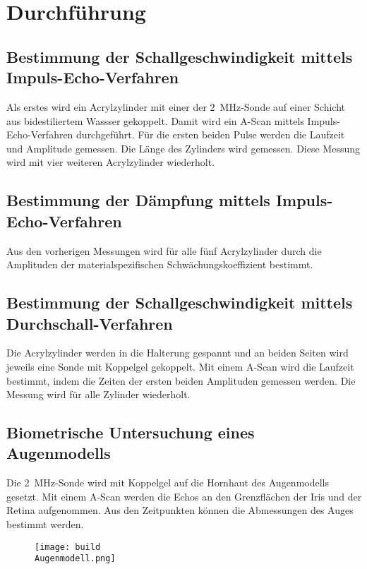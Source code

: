 \section{Durchführung}
\label{sec:Durchführung}

\subsection{Bestimmung der Schallgeschwindigkeit mittels Impuls-Echo-Verfahren}
Als erstes wird ein Acrylzylinder mit 
einer der \SI{2}{\mega\hertz}-Sonde auf einer Schicht aus bidestiliertem 
Wassser gekoppelt. Damit wird ein A-Scan mittels 
Impuls-Echo-Verfahren durchgeführt. Für die ersten beiden 
Pulse werden die Laufzeit und Amplitude 
gemessen. 
Die Länge des Zylinders wird gemessen.
Diese Messung wird mit vier weiteren Acrylzylinder wiederholt. 

\subsection{Bestimmung der Dämpfung mittels Impuls-Echo-Verfahren}
Aus den vorherigen Messungen wird für alle fünf Acrylzylinder
durch die Amplituden der materialspezifischen Schwächungskoeffizient bestimmt.

\subsection{Bestimmung der Schallgeschwindigkeit mittels Durchschall-Verfahren}
Die Acrylzylinder werden in die Halterung gespannt und an 
beiden Seiten wird jeweils eine Sonde mit Koppelgel gekoppelt. 
Mit einem A-Scan wird die Laufzeit bestimmt, indem die Zeiten
der ersten beiden Amplituden gemessen werden. Die Messung wird für alle 
Zylinder wiederholt.

\subsection{Biometrische Untersuchung eines Augenmodells}
Die \SI{2}{\mega\hertz}-Sonde wird mit Koppelgel auf die
Hornhaut des Augenmodells gesetzt. Mit einem A-Scan werden die
Echos an den Grenzflächen der Iris und der Retina aufgenommen.
Aus den Zeitpunkten können die Abmessungen des Auges bestimmt 
werden.
\begin{figure}
    \texttt{[image: build\\Augenmodell.png]}
    \caption{}
    \label{fig:augenmodell}
\end{figure}